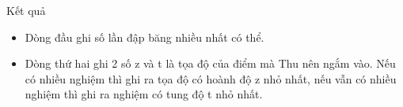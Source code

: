 Kết quả  
\begin{itemize}
	\item     Dòng đầu ghi số lần đập băng nhiều nhất có thể.   
	\item     Dòng thứ hai ghi 2 số z và t là tọa độ của điểm mà Thu nên ngắm vào. Nếu có nhiều nghiệm thì ghi ra tọa độ có hoành độ z nhỏ nhất, nếu vẫn có nhiều nghiệm thì ghi ra nghiệm có tung độ t nhỏ nhất.   
\end{itemize}